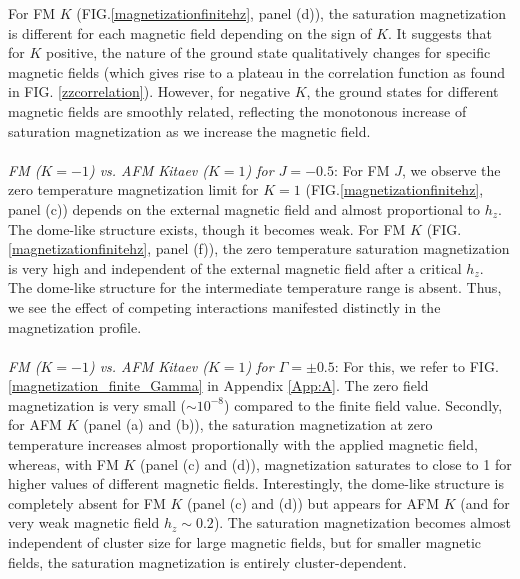\documentclass[aps,amsmath,twocolumn,amssymb,floatfix,showpacs,superscriptaddress,nofootinbib,longbibliography]{revtex4-1}
\begin{document}
For FM $K$ (FIG.\ref{magnetizationfinitehz}, panel (d)), the saturation magnetization is different for each magnetic field depending on the sign of $K$. It suggests that for $K$ positive, the nature of the ground state qualitatively changes for specific magnetic fields (which gives rise to a plateau in the correlation function as found in FIG. \ref{zzcorrelation}). However, for negative $K$, the ground states for different magnetic fields are smoothly related, reflecting the monotonous increase of saturation magnetization as we increase the magnetic field. 
\\\\\indent
{\it \small{FM ($K=-1$) vs. AFM Kitaev ($K=1$) for $J=-0.5$}}: For FM $J$, we observe the zero temperature magnetization limit for $K=1$ (FIG.\ref{magnetizationfinitehz}, panel (c)) depends on the external magnetic field and almost proportional to $h_z$. The dome-like structure exists, though it becomes weak. For FM $K$ (FIG.\ref{magnetizationfinitehz}, panel (f)), the zero temperature saturation magnetization is very high and independent of the external magnetic field after a critical $h_z$. The dome-like structure for the intermediate temperature range is absent. Thus, we see the effect of competing interactions manifested distinctly in the magnetization profile.
\\\\\indent
{\it \small{FM ($K=-1$) vs. AFM Kitaev ($K=1$) for $\Gamma=\pm0.5$}}: 
For this, we refer to FIG.\ref{magnetization_finite_Gamma} in Appendix \ref{App:A}. The zero field magnetization is very small ($\sim 10^{-8}$) compared to the finite field value. Secondly, for AFM $K$ (panel (a) and (b)), the saturation magnetization at zero temperature increases almost proportionally with the applied magnetic field, whereas, with FM $K$ (panel (c) and (d)), magnetization saturates to close to 1 for higher values of different magnetic fields. Interestingly, the dome-like structure is completely absent for FM $K$ (panel (c) and (d)) but appears for AFM $K$ (and for very weak magnetic field $h_z\sim 0.2$). The saturation magnetization becomes almost independent of cluster size for large magnetic fields, but for smaller magnetic fields, the saturation magnetization is entirely cluster-dependent.
\end{document}
